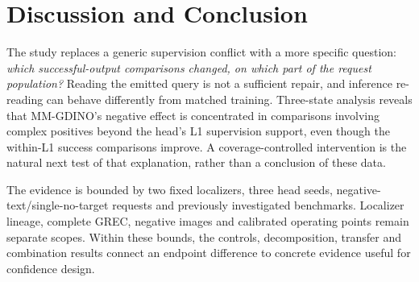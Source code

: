 \documentclass[10pt,twocolumn,letterpaper]{article}
\begin{document}
\section{Discussion and Conclusion}
The study replaces a generic supervision conflict with a more specific
question: \emph{which successful-output comparisons changed, on which
part of the request population?} Reading the emitted query is not a
sufficient repair, and inference re-reading can behave differently from
matched training. Three-state analysis reveals that MM-GDINO's negative
effect is concentrated in comparisons involving complex positives beyond
the head's L1 supervision support, even though the within-L1 success
comparisons improve. A coverage-controlled intervention is the natural
next test of that explanation, rather than a conclusion of these data.

The evidence is bounded by two fixed localizers, three head seeds,
negative-text/single-no-target requests and previously investigated
benchmarks. Localizer lineage, complete GREC, negative images and
calibrated operating points remain separate scopes. Within these bounds,
the controls, decomposition, transfer and combination results connect
an endpoint difference to concrete evidence useful for confidence design.

\FloatBarrier
{\small}
\end{document}
